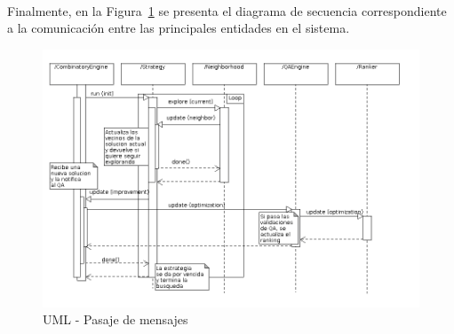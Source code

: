 \paragraph{}
Finalmente, en la Figura~\ref{uml:sequence} se presenta el diagrama de
secuencia correspondiente a la comunicaci\'on entre las principales entidades en
el sistema.

\begin{figure}
  \centering
  \includegraphics[scale=0.5]{sequence.png}  
  \caption{UML - Pasaje de mensajes}
  \label{uml:sequence}
\end{figure}

